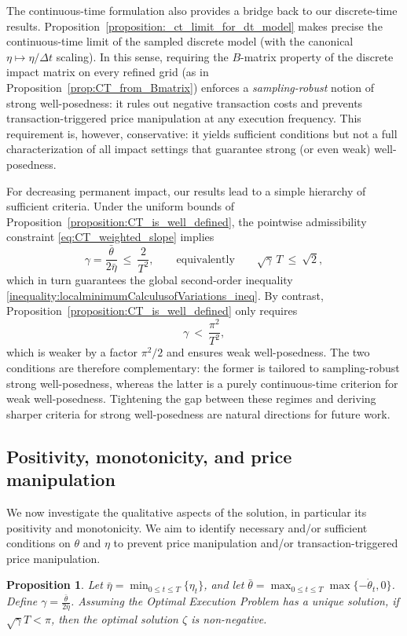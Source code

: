 \documentclass[final,3p,authoryear,12pt]{elsarticle}
\newtheorem{proposition}{Proposition}
\begin{document}
\medskip
The continuous-time formulation also provides a bridge back to our discrete-time results.
Proposition~\ref{proposition:_ct_limit_for_dt_model} makes precise the continuous-time
limit of the sampled discrete model (with the canonical $\eta\mapsto \eta/\Delta t$
scaling). In this sense, requiring the $B$-matrix property of the discrete impact
matrix on every refined grid (as in Proposition~\ref{prop:CT_from_Bmatrix}) enforces a
\emph{sampling-robust} notion of strong well-posedness: it rules out negative
transaction costs and prevents transaction-triggered price manipulation at any
execution frequency. This requirement is, however, conservative: it yields sufficient
conditions but not a full characterization of all impact settings that guarantee
strong (or even weak) well-posedness.

For decreasing permanent impact, our results lead to a simple hierarchy of sufficient
criteria. Under the uniform bounds of Proposition~\ref{proposition:CT_is_well_defined},
the pointwise admissibility constraint \eqref{eq:CT_weighted_slope} implies
\[
\gamma=\frac{\bar\theta}{2\bar\eta}\ \le\ \frac{2}{T^{2}},
\qquad\text{equivalently}\qquad
\sqrt{\gamma}\,T\ \le\ \sqrt{2},
\]
which in turn guarantees the global second-order inequality
\eqref{inequality:localminimumCalculusofVariations_ineq}. By contrast,
Proposition~\ref{proposition:CT_is_well_defined} only requires
\[
\gamma\ <\ \frac{\pi^{2}}{T^{2}},
\]
which is weaker by a factor $\pi^{2}/2$ and ensures weak well-posedness.
The two conditions are therefore complementary: the former is tailored to
sampling-robust strong well-posedness, whereas the latter is a purely continuous-time
criterion for weak well-posedness. Tightening the gap between these regimes and
deriving sharper criteria for strong well-posedness are natural directions for future work.





\subsection{Positivity, monotonicity, and price manipulation}
\label{subsection:Qualitative_insights}

We now investigate the qualitative aspects of the solution, in particular its positivity and monotonicity. We aim to identify necessary and/or sufficient conditions on $\theta$ and $\eta$ to prevent price manipulation and/or transaction-triggered price manipulation.

\begin{proposition}
\label{proposition:boundedbelow}
    Let $\bar{\eta}=\min_{0 \le t \le T} \{ \eta_{t} \}$, and let
    $\bar{\theta}=\max_{0 \le t \le T}\max\{-\dot \theta_{t},0\}$. Define
    $\gamma=\frac{\bar{\theta}}{2\bar{\eta}}$. Assuming the Optimal Execution
    Problem has a unique solution, if $\sqrt{\gamma}T < \pi$, then the optimal
    solution $\zeta$ is non-negative.
\end{proposition}
\end{document}
